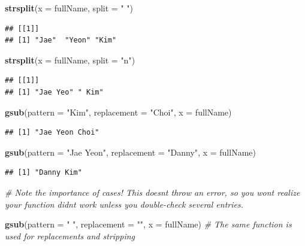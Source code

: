 \documentclass[
]{book}
\newenvironment{Shaded}{\begin{snugshade}}{\end{snugshade}}
\newcommand{\AttributeTok}[1]{\textcolor[rgb]{0.13,0.29,0.53}{#1}}
\newcommand{\CommentTok}[1]{\textcolor[rgb]{0.56,0.35,0.01}{\textit{#1}}}
\newcommand{\FunctionTok}[1]{\textcolor[rgb]{0.13,0.29,0.53}{\textbf{#1}}}
\newcommand{\NormalTok}[1]{#1}
\newcommand{\StringTok}[1]{\textcolor[rgb]{0.31,0.60,0.02}{#1}}
\begin{document}
\begin{Shaded}
\begin{Highlighting}[]
\FunctionTok{strsplit}\NormalTok{(}\AttributeTok{x =}\NormalTok{ fullName, }\AttributeTok{split =} \StringTok{" "}\NormalTok{)}
\end{Highlighting}
\end{Shaded}

\begin{verbatim}
## [[1]]
## [1] "Jae"  "Yeon" "Kim"
\end{verbatim}

\begin{Shaded}
\begin{Highlighting}[]
\FunctionTok{strsplit}\NormalTok{(}\AttributeTok{x =}\NormalTok{ fullName, }\AttributeTok{split =} \StringTok{"n"}\NormalTok{)}
\end{Highlighting}
\end{Shaded}

\begin{verbatim}
## [[1]]
## [1] "Jae Yeo" " Kim"
\end{verbatim}

\begin{Shaded}
\begin{Highlighting}[]
\FunctionTok{gsub}\NormalTok{(}\AttributeTok{pattern =} \StringTok{"Kim"}\NormalTok{, }\AttributeTok{replacement =} \StringTok{"Choi"}\NormalTok{, }\AttributeTok{x =}\NormalTok{ fullName)}
\end{Highlighting}
\end{Shaded}

\begin{verbatim}
## [1] "Jae Yeon Choi"
\end{verbatim}

\begin{Shaded}
\begin{Highlighting}[]
\FunctionTok{gsub}\NormalTok{(}\AttributeTok{pattern =} \StringTok{"Jae Yeon"}\NormalTok{, }\AttributeTok{replacement =} \StringTok{"Danny"}\NormalTok{, }\AttributeTok{x =}\NormalTok{ fullName)}
\end{Highlighting}
\end{Shaded}

\begin{verbatim}
## [1] "Danny Kim"
\end{verbatim}

\begin{Shaded}
\begin{Highlighting}[]
\CommentTok{\# Note the importance of cases! This doesn\textquotesingle{}t throw an error, so you won\textquotesingle{}t realize your function didn\textquotesingle{}t work unless you double{-}check several entries.}

\FunctionTok{gsub}\NormalTok{(}\AttributeTok{pattern =} \StringTok{" "}\NormalTok{, }\AttributeTok{replacement =} \StringTok{""}\NormalTok{, }\AttributeTok{x =}\NormalTok{ fullName) }\CommentTok{\# The same function is used for replacements and stripping}
\end{Highlighting}
\end{Shaded}
\end{document}
